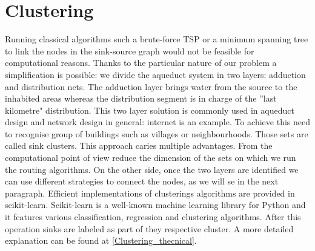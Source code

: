 \section{Clustering}
Running classical algorithms such a brute-force TSP or a minimum spanning tree to link
the nodes in the sink-source graph would not be feasible for computational reasons. 
Thanks to the particular nature of our problem a simplification is possible: we divide the aqueduct
system in two layers: adduction and distribution nets. The adduction layer brings water from the
source to the inhabited areas whereas the distribution segment is in charge of the ”last kilometre" 
distribution. This two layer solution is commonly used in aqueduct design and network design in 
general: internet is an example. To achieve this need to recognise group of buildings such as villages 
or neighbourhoods. Those sets are called sink clusters.
This approach caries multiple advantages. From the computational point of view reduce the dimension 
of the sets on which we run the routing algorithms.  On the other side, once the two layers are 
identified we can use different strategies to connect the nodes, as we will se in the next paragraph.
Efficient implementations of clusterings algorithms are provided in scikit-learn. Scikit-learn is a 
well-known machine learning library for Python and it features various classification, regression and
clustering algorithms. After this operation sinks are labeled as part of they respective cluster. 
A more detailed explanation can be found at \ref{Clustering_thecnical}.

